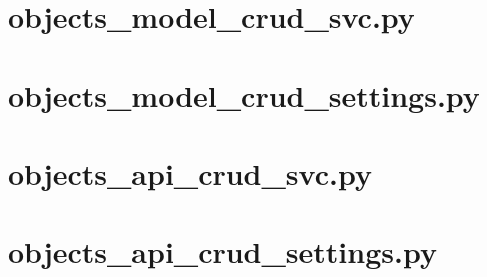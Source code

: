 \documentclass[a4paper,8pt]{article}
\begin{document}
\section{objects\_model\_crud\_svc.py}


\section{objects\_model\_crud\_settings.py}


\section{objects\_api\_crud\_svc.py}


\section{objects\_api\_crud\_settings.py}

\end{document}
